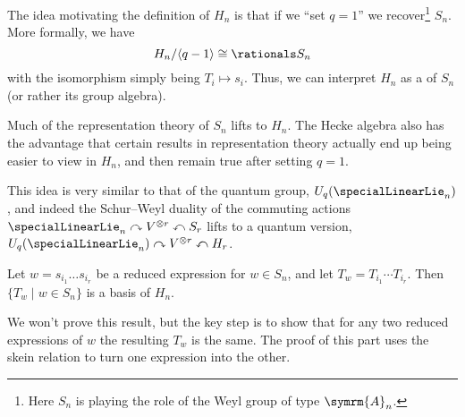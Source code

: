 \documentclass[fleqn]{NotesClass}
\newcommand{\isomorphic}{\cong}
\newcommand{\dynkin}[2]{\symrm{#1}_{#2}}
\begin{document}
    The idea motivating the definition of \(H_n\) is that if we \enquote{set \(q = 1\)} we recover\footnote{Here \(S_n\) is playing the role of the Weyl group of type \(\dynkin{A}{n}\).} \(S_n\).
    More formally, we have
    \begin{equation}
        H_n / \langle q - 1 \rangle \isomorphic \rationals S_n
    \end{equation}
    with the isomorphism simply being \(T_i \mapsto s_i\).
    Thus, we can interpret \(H_n\) as a  of \(S_n\) (or rather its group algebra).
    
    Much of the representation theory of \(S_n\) lifts to \(H_n\).
    The Hecke algebra also has the advantage that certain results in representation theory actually end up being easier to view in \(H_n\), and then remain true after setting \(q = 1\).
    
    This idea is very similar to that of the quantum group, \(U_q(\specialLinearLie_n)\), and indeed the Schur--Weyl duality of the commuting actions \(\specialLinearLie_n \curvearrowright V^{\otimes r} \curvearrowleft S_r\) lifts to a quantum version, \(U_q(\specialLinearLie_n) \curvearrowright V^{\otimes r} \curvearrowleft H_r\).
    
    \begin{prp}{}{}
        Let \(w = s_{i_1} \dotsc s_{i_r}\) be a reduced expression for \(w \in S_n\), and let \(T_w = T_{i_1} \dotsm T_{i_r}\).
        Then \(\{T_w \mid w \in S_n\}\) is a basis of \(H_n\).
    \end{prp}
    
    We won't prove this result, but the key step is to show that for any two reduced expressions of \(w\) the resulting \(T_w\) is the same.
    The proof of this part uses the skein relation to turn one expression into the other.
    
%	    

    \backmatter
    \renewcommand{\glossaryname}{Acronyms}
    \printglossary[acronym]
    \printindex
\end{document}
